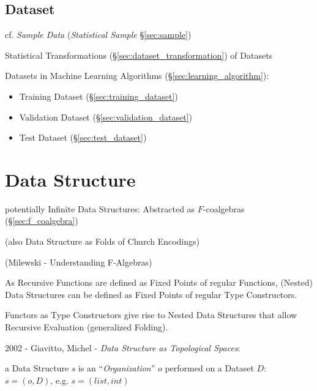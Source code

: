 \subsection{Dataset}\label{sec:dataset}

cf. \emph{Sample Data} (\emph{Statistical Sample} \S\ref{sec:sample})

\fist Statistical Transformations (\S\ref{sec:dataset_transformation}) of
Datasets

Datasets in Machine Learning Algorithms (\S\ref{sec:learning_algorithm}):
\begin{itemize}
  \item Training Dataset (\S\ref{sec:training_dataset})
  \item Validation Dataset (\S\ref{sec:validation_dataset})
  \item Test Dataset (\S\ref{sec:test_dataset})
\end{itemize}



\section{Data Structure}\label{sec:data_structure}


potentially Infinite Data Structures: Abstracted as $F$-coalgebras
(\S\ref{sec:f_coalgebra})

(also Data Structure as Folds of Church Encodings)

(Milewski - Understanding F-Algebras)

As Recursive Functions are defined as Fixed Points of regular
Functions, (Nested) Data Structures can be defined as Fixed Points of
regular Type Constructors.

Functors as Type Constructors give rise to Nested Data Structures that
allow Recursive Evaluation (generalized Folding).

2002 - Giavitto, Michel - \emph{Data Structure as Topological Spaces}:

a Data Structure $s$ is an ``\emph{Organization}'' $o$ performed on a Dataset
$D$: $s = (o, D)$, e.g. $s = (list, int)$



